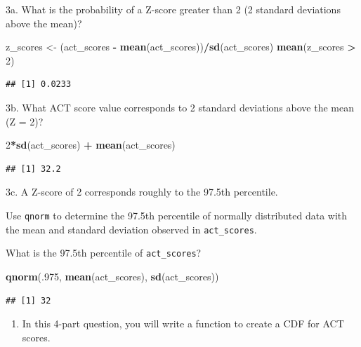 \documentclass[
]{article}
\newenvironment{Shaded}{\begin{snugshade}}{\end{snugshade}}
\newcommand{\DecValTok}[1]{\textcolor[rgb]{0.00,0.00,0.81}{#1}}
\newcommand{\KeywordTok}[1]{\textcolor[rgb]{0.13,0.29,0.53}{\textbf{#1}}}
\newcommand{\NormalTok}[1]{#1}
\newcommand{\OperatorTok}[1]{\textcolor[rgb]{0.81,0.36,0.00}{\textbf{#1}}}
\newcommand{\StringTok}[1]{\textcolor[rgb]{0.31,0.60,0.02}{#1}}
\providecommand{\tightlist}{%
  \setlength{\itemsep}{0pt}\setlength{\parskip}{0pt}}
\begin{document}
3a. What is the probability of a Z-score greater than 2 (2 standard
deviations above the mean)?

\begin{Shaded}
\begin{Highlighting}[]
\NormalTok{z\_scores \textless{}{-}}\StringTok{ }\NormalTok{(act\_scores }\OperatorTok{{-}}\StringTok{ }\KeywordTok{mean}\NormalTok{(act\_scores))}\OperatorTok{/}\KeywordTok{sd}\NormalTok{(act\_scores)}
\KeywordTok{mean}\NormalTok{(z\_scores }\OperatorTok{\textgreater{}}\StringTok{ }\DecValTok{2}\NormalTok{)}
\end{Highlighting}
\end{Shaded}

\begin{verbatim}
## [1] 0.0233
\end{verbatim}

3b. What ACT score value corresponds to 2 standard deviations above the
mean (Z = 2)?

\begin{Shaded}
\begin{Highlighting}[]
\DecValTok{2}\OperatorTok{*}\KeywordTok{sd}\NormalTok{(act\_scores) }\OperatorTok{+}\StringTok{ }\KeywordTok{mean}\NormalTok{(act\_scores)}
\end{Highlighting}
\end{Shaded}

\begin{verbatim}
## [1] 32.2
\end{verbatim}

3c. A Z-score of 2 corresponds roughly to the 97.5th percentile.

Use \texttt{qnorm} to determine the 97.5th percentile of normally
distributed data with the mean and standard deviation observed in
\texttt{act\_scores}.

What is the 97.5th percentile of \texttt{act\_scores}?

\begin{Shaded}
\begin{Highlighting}[]
\KeywordTok{qnorm}\NormalTok{(.}\DecValTok{975}\NormalTok{, }\KeywordTok{mean}\NormalTok{(act\_scores), }\KeywordTok{sd}\NormalTok{(act\_scores))}
\end{Highlighting}
\end{Shaded}

\begin{verbatim}
## [1] 32
\end{verbatim}

\begin{enumerate}
\def\labelenumi{\arabic{enumi}.}
\setcounter{enumi}{3}
\tightlist
\item
  In this 4-part question, you will write a function to create a CDF for
  ACT scores.
\end{enumerate}
\end{document}
